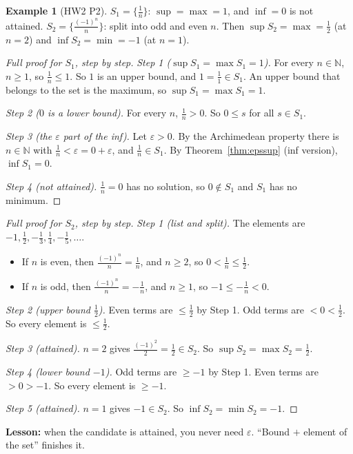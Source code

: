 \documentclass[11pt]{article}
\theoremstyle{definition}
\newtheorem{ex}[defn]{Example}
\newcommand{\N}{\mathbb{N}}
\newcommand{\eps}{\varepsilon}
\newcommand{\key}[1]{\textcolor{red!70!black}{\textbf{#1}}}
\begin{document}
\begin{ex}[HW2 P2]
$S_1=\{\frac1n\}$: $\sup=\max=1$, and $\inf=0$ is not attained.
$S_2=\{\frac{(-1)^n}{n}\}$: split into odd and even $n$. Then
$\sup S_2=\max=\frac12$ (at $n=2$) and $\inf S_2=\min=-1$ (at $n=1$).

\begin{proof}[Full proof for $S_1$, step by step]
\emph{Step 1 ($\sup S_1=\max S_1=1$).} For every $n\in\N$, $n\ge1$, so
$\frac1n\le1$. So $1$ is an upper bound, and $1=\frac11\in S_1$. An upper
bound that belongs to the set is the maximum, so $\sup S_1=\max S_1=1$.

\emph{Step 2 ($0$ is a lower bound).} For every $n$, $\frac1n>0$. So
$0\le s$ for all $s\in S_1$.

\emph{Step 3 (the $\eps$ part of the inf).} Let $\eps>0$. By the
Archimedean property there is $n\in\N$ with $\frac1n<\eps=0+\eps$, and
$\frac1n\in S_1$. By Theorem~\ref{thm:epssup} (inf version), $\inf S_1=0$.

\emph{Step 4 (not attained).} $\frac1n=0$ has no solution, so
$0\notin S_1$ and $S_1$ has no minimum.
\end{proof}

\begin{proof}[Full proof for $S_2$, step by step]
\emph{Step 1 (list and split).} The elements are
$-1,\frac12,-\frac13,\frac14,-\frac15,\dots$.
\begin{itemize}[nosep]
  \item If $n$ is even, then $\frac{(-1)^n}{n}=\frac1n$, and $n\ge2$, so
        $0<\frac1n\le\frac12$.
  \item If $n$ is odd, then $\frac{(-1)^n}{n}=-\frac1n$, and $n\ge1$, so
        $-1\le-\frac1n<0$.
\end{itemize}

\emph{Step 2 (upper bound $\frac12$).} Even terms are $\le\frac12$ by
Step 1. Odd terms are $<0<\frac12$. So every element is $\le\frac12$.

\emph{Step 3 (attained).} $n=2$ gives $\frac{(-1)^2}{2}=\frac12\in S_2$.
So $\sup S_2=\max S_2=\frac12$.

\emph{Step 4 (lower bound $-1$).} Odd terms are $\ge-1$ by Step 1. Even
terms are $>0>-1$. So every element is $\ge-1$.

\emph{Step 5 (attained).} $n=1$ gives $-1\in S_2$. So
$\inf S_2=\min S_2=-1$.
\end{proof}
\noindent\key{Lesson:} when the candidate is attained, you never need
$\eps$. ``Bound $+$ element of the set'' finishes it.
\end{ex}
\end{document}
